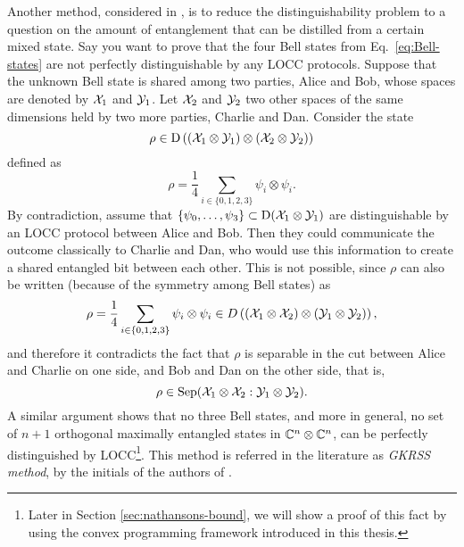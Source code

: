 Another method, considered in \cite{Ghosh01,Ghosh04}, is to reduce the distinguishability 
problem to a question on the amount of entanglement that can be distilled from a 
certain mixed state. 
Say you want to prove that the four Bell states from Eq.~\eqref{eq:Bell-states}
are not perfectly distinguishable by any LOCC protocols.
Suppose that the unknown Bell state is shared among two parties, Alice and Bob,
whose spaces are denoted by $\mathcal{X}_{1}$ and $\mathcal{Y}_{1}$. Let $\mathcal{X}_{2}$ and $\mathcal{Y}_{2}$ two 
other spaces of the same dimensions held by two more parties, Charlie and Dan. 
Consider the state
\begin{equation}
  \rho \in \mathrm{D}\left((\mathcal{X}_{1}\otimes\mathcal{Y}_{1})\otimes(\mathcal{X}_{2}\otimes\mathcal{Y}_{2})\right)
\end{equation}
defined as
\begin{equation}
  \rho = \frac{1}{4}\sum_{i\in\{0,1,2,3\}}\psi_{i}\otimes\psi_{i}.
\end{equation}
By contradiction, assume that $\{\psi_{0}, \ldots, \psi_{3}\} \subset \mathrm{D}(\mathcal{X}_{1}\otimes\mathcal{Y}_{1})$
are distinguishable by an LOCC protocol between Alice and Bob.
Then they could communicate the outcome classically to Charlie and Dan, 
who would use this information to create a shared entangled bit between each other.
This is not possible, since $\rho$ can also be written (because of the symmetry among Bell states) as  
\begin{equation}
  \rho = \frac{1}{4}\sum_{i\in\{0,1,2,3\}}\psi_{i}\otimes\psi_{i}
    \in D\left((\mathcal{X}_{1}\otimes\mathcal{X}_{2})\otimes(\mathcal{Y}_{1}\otimes\mathcal{Y}_{2})\right),
\end{equation}
and therefore it contradicts the fact that $\rho$ is separable in the cut 
between Alice and Charlie on one side, and Bob and Dan on the other side, that is,
\begin{equation}
  \rho \in \mathrm{Sep}(\mathcal{X}_{1}\otimes\mathcal{X}_{2} : \mathcal{Y}_{1}\otimes\mathcal{Y}_{2}).
\end{equation}
A similar argument shows that no three Bell states, and more in general, 
no set of $n+1$ orthogonal maximally entangled states in $\mathbb{C}^{n}\otimes\mathbb{C}^{n}$, 
can be perfectly distinguished by LOCC\footnote{Later in Section \ref{sec:nathansons-bound}, 
we will show a proof of this fact by using the convex programming framework introduced in this thesis.}. 
This method is referred in the literature as \emph{GKRSS method}, 
by the initials of the authors of \cite{Ghosh01}.

